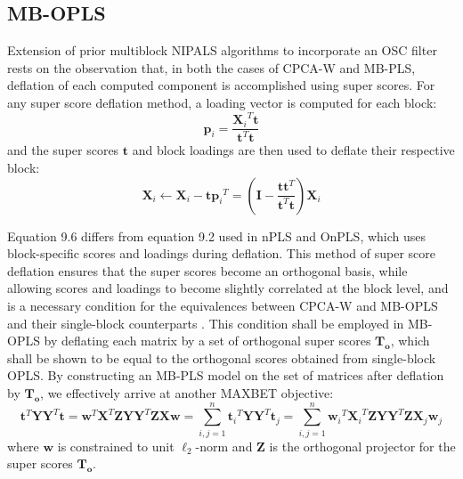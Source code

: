 \subsection{MB-OPLS}

\begin{doublespace}
Extension of prior multiblock NIPALS algorithms to incorporate an OSC filter
rests on the observation that, in both the cases of CPCA-W and MB-PLS,
deflation of each computed component is accomplished using super scores.
For any super score deflation method, a loading vector is computed for each
block:
\begin{equation*}
\mathbf{p}_i = \frac{{\mathbf{X}_i}^T \mathbf{t}}
                    {\mathbf{t}^T \mathbf{t}}
\end{equation*}
and the super scores $\mathbf{t}$ and block loadings are then used to deflate
their respective block:
\begin{equation}
\mathbf{X}_i \gets \mathbf{X}_i - \mathbf{t} {\mathbf{p}_i}^T =
 \left( \mathbf{I} - \frac{\mathbf{t} \mathbf{t}^T}
                          {\mathbf{t}^T \mathbf{t}}
 \right) \mathbf{X}_i
\end{equation}

Equation 9.6 differs from equation 9.2 used in nPLS and OnPLS, which uses
block-specific scores and loadings during deflation. This method of super
score deflation ensures that the super scores become an orthogonal basis,
while allowing scores and loadings to become slightly correlated at the
block level, and is a necessary condition for the equivalences between
CPCA-W and MB-OPLS and their single-block counterparts
\cite{westerhuis:jchemo1998}. This condition shall be employed in MB-OPLS
by deflating each matrix by a set of orthogonal super scores $\mathbf{T_o}$,
which shall be shown to be equal to the orthogonal scores obtained from
single-block OPLS. By constructing an MB-PLS model on the set of matrices
after deflation by $\mathbf{T_o}$, we effectively arrive at another MAXBET
objective:
\begin{equation}
\mathbf{t}^T \mathbf{Y} \mathbf{Y}^T \mathbf{t} =
 \mathbf{w}^T \mathbf{X}^T \mathbf{Z} \mathbf{Y}
 \mathbf{Y}^T \mathbf{Z} \mathbf{X} \mathbf{w} =
\sum_{i,j=1}^n
 {\mathbf{t}_i}^T \mathbf{Y} \mathbf{Y}^T \mathbf{t}_j =
\sum_{i,j=1}^n
 {\mathbf{w}_i}^T {\mathbf{X}_i}^T \mathbf{Z}
  \mathbf{Y} \mathbf{Y}^T
 \mathbf{Z} \mathbf{X}_j \mathbf{w}_j
\end{equation}
where $\mathbf{w}$ is constrained to unit $\ell_2$-norm and $\mathbf{Z}$ is
the orthogonal projector for the super scores $\mathbf{T_o}$.
\end{doublespace}

